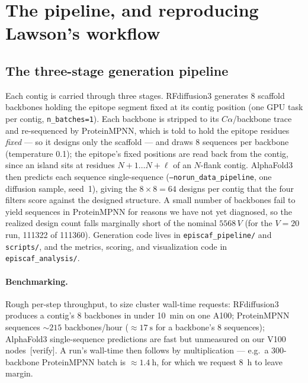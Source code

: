 \section{The pipeline, and reproducing Lawson's workflow}\label{sec:methods}

\subsection{The three-stage generation pipeline}
Each contig is carried through three stages. RFdiffusion3 generates \num{8} scaffold
backbones holding the epitope segment fixed at its contig position (one GPU task per contig,
\texttt{n\_batches=1}). Each backbone is stripped to its $C\alpha$/backbone trace and re-sequenced
by ProteinMPNN, which is told to hold the epitope residues \emph{fixed} --- so it designs only
the scaffold --- and draws \num{8} sequences per backbone (temperature \num{0.1}); the epitope's
fixed positions are read back from the contig, since an island sits at residues $N{+}1\ldots
N{+}\ell$ of an $N$-flank contig. AlphaFold3 then predicts each sequence single-sequence
(\texttt{--norun\_data\_pipeline}, one diffusion sample, seed~1), giving the
$\num{8}\times\num{8}=\num{64}$ designs per contig that the four filters score against the
designed structure. A small number of backbones fail to yield sequences in ProteinMPNN for
reasons we have not yet diagnosed, so the realized design count falls marginally short of the
nominal $\num{5568}\,V$ (for the $V=\num{20}$ run, \num{111322} of \num{111360}).
Generation code lives in \texttt{episcaf\_pipeline/} and \texttt{scripts/},
and the metrics, scoring, and visualization code in \texttt{episcaf\_analysis/}.

\paragraph{Benchmarking.} Rough per-step throughput, to size cluster wall-time requests:
RFdiffusion3 produces a contig's \num{8} backbones in under \SI{10}{\minute} on one A100;
ProteinMPNN sequences $\sim\!\num{215}$ backbones/hour ($\approx\SI{17}{\second}$ for a
backbone's \num{8} sequences); AlphaFold3 single-sequence predictions are fast but unmeasured
on our V100 nodes~[verify]. A run's wall-time then follows by multiplication --- e.g.\ a
\num{300}-backbone ProteinMPNN batch is $\approx\SI{1.4}{\hour}$, for which we request
\SI{8}{\hour} to leave margin.

